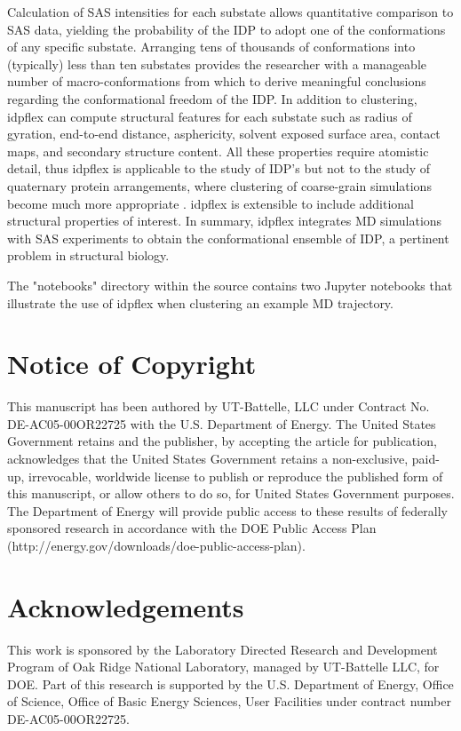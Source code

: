 \documentclass[12pt]{article}
\begin{document}
Calculation of SAS intensities \cite{Svergun95} for each substate allows quantitative comparison to SAS data, yielding the probability of the IDP to adopt one of the conformations of any specific substate.
Arranging tens of thousands of conformations into (typically) less than ten substates provides the researcher with a manageable number of macro-conformations from which to derive meaningful conclusions regarding the conformational freedom of the IDP.
In addition to clustering, idpflex can compute structural features for each substate such as radius of gyration, end-to-end distance, asphericity, solvent exposed surface area, contact maps, and secondary structure content.
All these properties require atomistic detail, thus idpflex is applicable to the study of IDP's but not to the study of quaternary protein arrangements, where clustering of coarse-grain simulations become much more appropriate \cite{Rozycki11}.
idpflex is extensible to include additional structural properties of interest.
In summary, idpflex integrates MD simulations with SAS experiments to obtain the conformational ensemble of IDP, a pertinent problem in structural biology.

The "notebooks" directory within the source contains two Jupyter notebooks that illustrate the use of idpflex when clustering an example MD trajectory.

\section{Notice of Copyright}\label{notice-of-copyright}

This manuscript has been authored by UT-Battelle, LLC under Contract No.
DE-AC05-00OR22725 with the U.S. Department of Energy. The United States
Government retains and the publisher, by accepting the article for
publication, acknowledges that the United States Government retains a
non-exclusive, paid-up, irrevocable, worldwide license to publish or
reproduce the published form of this manuscript, or allow others to do
so, for United States Government purposes. The Department of Energy will
provide public access to these results of federally sponsored research
in accordance with the DOE Public Access Plan
(http://energy.gov/downloads/doe-public-access-plan).

\section{Acknowledgements}\label{acknowledgements}
This work is sponsored by the Laboratory Directed Research and
Development Program of Oak Ridge National Laboratory, managed by
UT-Battelle LLC, for DOE. Part of this research is supported by the U.S.
Department of Energy, Office of Science, Office of Basic Energy
Sciences, User Facilities under contract number DE-AC05-00OR22725.



\end{document}
